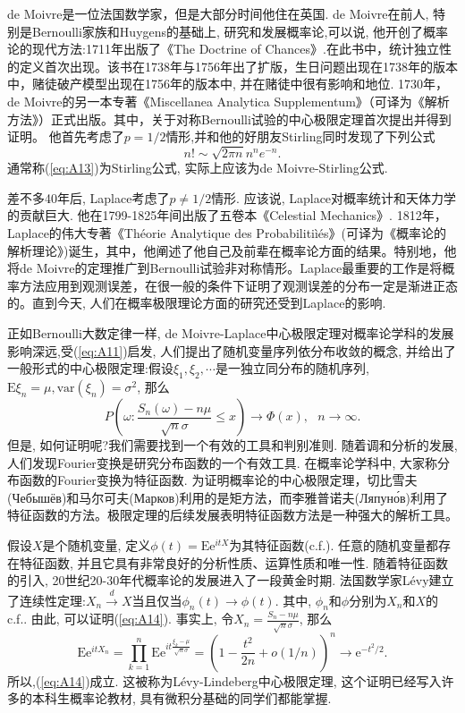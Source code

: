 de Moivre是一位法国数学家，但是大部分时间他住在英国. de Moivre在前人, 特别是Bernoulli家族和Huygens的基础上, 研究和发展概率论,可以说, 他开创了概率论的现代方法:1711年出版了《The Doctrine of Chances》.在此书中，统计独立性的定义首次出现。该书在1738年与1756年出了扩版，生日问题出现在1738年的版本中，赌徒破产模型出现在1756年的版本中, 并在赌徒中很有影响和地位.
1730年，de Moivre的另一本专著《Miscellanea Analytica Supplementum》（可译为《解析方法》）正式出版。其中，关于对称Bernoulli试验的中心极限定理首次提出并得到证明。
他首先考虑了$p=1/2$情形,并和他的好朋友Stirling同时发现了下列公式\begin{equation}\label{eq:A13}
n!\sim \sqrt{2\pi n}n^ne^{-n}.
\end{equation}
通常称(\ref{eq:A13})为Stirling公式, 实际上应该为de Moivre-Stirling公式.

差不多40年后, Laplace考虑了$p\neq 1/2$情形. 应该说, Laplace对概率统计和天体力学的贡献巨大. 他在1799-1825年间出版了五卷本《Celestial Mechanics》.
1812年，Laplace的伟大专著《Théorie Analytique des Probabilitiìés》(可译为《概率论的解析理论》)诞生，其中，他阐述了他自己及前辈在概率论方面的结果。特别地，他将de Moivre的定理推广到Bernoulli试验非对称情形。Laplace最重要的工作是将概率方法应用到观测误差，在很一般的条件下证明了观测误差的分布一定是渐进正态的。直到今天, 人们在概率极限理论方面的研究还受到Laplace的影响.

正如Bernoulli大数定律一样, de Moivre-Laplace中心极限定理对概率论学科的发展影响深远,受(\ref{eq:A11})启发, 人们提出了随机变量序列依分布收敛的概念, 并给出了一般形式的中心极限定理:假设$\xi_1,\xi_2,\cdots$是一独立同分布的随机序列,$\mathrm{E}\xi_n = \mu,\mathrm{var}(\xi_n) = \sigma^2$, 那么
\begin{equation}\label{eq:A14}
P\left( \omega:\frac{S_n(\omega)-n\mu}{\sqrt{n}\sigma}\leqslant x \right) \to \Phi(x),~~~n\to\infty.
\end{equation}
但是, 如何证明呢?我们需要找到一个有效的工具和判别准则. 随着调和分析的发展, 人们发现Fourier变换是研究分布函数的一个有效工具. 在概率论学科中, 大家称分布函数的Fourier变换为特征函数. 为证明概率论的中心极限定理，切比雪夫(Чебышёв)和马尔可夫(Марков)利用的是矩方法，而李雅普诺夫(Ляпуно́в)利用了特征函数的方法。极限定理的后续发展表明特征函数方法是一种强大的解析工具。

假设$X$是个随机变量, 定义$\phi(t) = \mathrm{E}\mathrm{e}^{itX}$为其特征函数(c.f.). 任意的随机变量都存在特征函数, 并且它具有非常良好的分析性质、运算性质和唯一性. 随着特征函数的引入, 20世纪20-30年代概率论的发展进入了一段黄金时期. 法国数学家Lévy建立了连续性定理:$X_n\stackrel{d}{\rightarrow}X$当且仅当$\phi_n(t)\to\phi(t)$. 其中, $\phi_n$和$\phi$分别为$X_n$和$X$的c.f.. 由此, 可以证明(\ref{eq:A14}). 事实上, 令$X_n = \frac{S_n-n\mu}{\sqrt{n}\sigma}$, 那么
\begin{equation}\label{eq:A15}
\mathrm{E}\mathrm{e}^{itX_n} =\prod_{k=1}^n\mathrm{E}\mathrm{e}^{it\frac{\xi_k-\mu}{\sqrt{n}\sigma}}
=\left( 1-\frac{t^2}{2n}+o(1/n) \right)^n
\to \mathrm{e}^{-t^2/2}.
\end{equation}
所以,(\ref{eq:A14})成立. 这被称为Lévy-Lindeberg中心极限定理, 这个证明已经写入许多的本科生概率论教材, 具有微积分基础的同学们都能掌握.

